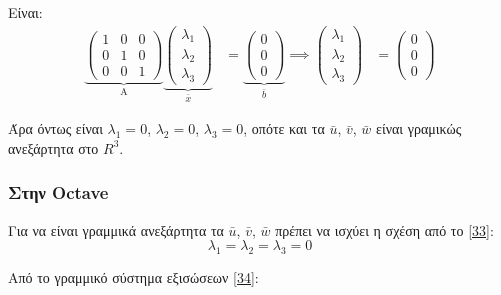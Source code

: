 \documentclass[12pt]{extreport}
\begin{document}
Είναι:
\begin{equation*}
    \begin{aligned}
        \underbrace{
            \begin{pmatrix}
                1 & 0 & 0 \\
                0 & 1 & 0 \\
                0 & 0 & 1
            \end{pmatrix}}_\text{A}
        \underbrace{
        \begin{pmatrix}
                \lambda_{1} \\
                \lambda_{2} \\
                \lambda_{3}
            \end{pmatrix}}_\text{$\bar{x}$} & =
        \underbrace{
            \begin{pmatrix}
                0 \\
                0 \\
                0
            \end{pmatrix}}_\text{$\bar{b}$}
        \implies
        \begin{pmatrix}
            \lambda_{1} \\
            \lambda_{2} \\
            \lambda_{3}
        \end{pmatrix}                   & =
        \begin{pmatrix}
            0 \\
            0 \\
            0
        \end{pmatrix}
    \end{aligned}
\end{equation*}

Άρα όντως είναι $\lambda_{1}=0$, $\lambda_{2}=0$, $\lambda_{3}=0$, οπότε και τα $\bar{u}$, $\bar{v}$, $\bar{w}$ είναι γραμικώς ανεξάρτητα στο $R^{3}$.

\subsubsection{Στην Octave}

Για να είναι γραμμικά ανεξάρτητα τα $\bar{u}$, $\bar{v}$, $\bar{w}$ πρέπει να ισχύει η σχέση από το \eqref{33}:
\begin{equation*}
    \lambda_{1} = \lambda_{2} = \lambda_{3} = 0
\end{equation*}

Από το γραμμικό σύστημα εξισώσεων \eqref{34}:
\end{document}
